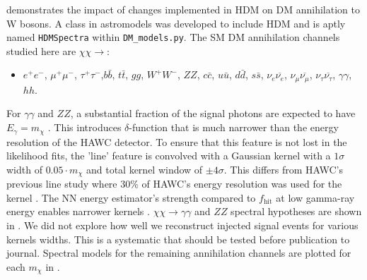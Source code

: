  demonstrates the impact of changes implemented in HDM on DM
annihilation to W bosons.
A class in astromodels was developed to include HDM and is aptly named \texttt{HDMSpectra} within \texttt{DM\_models.py}.
The SM DM annihilation channels studied here are $\chi\chi \rightarrow$:
\begin{itemize}
    \item[] $e^+e^-$, $\mu^+\mu^-$, $\tau^+\tau^-$,$b\bar{b}$, $t\bar{t}$, $gg$, $W^+W^-$, $ZZ$, $c\bar{c}$, $u\bar{u}$, $d\bar{d}$, $s\bar{s}$, $\nu_e \overline{\nu_e}$, $\nu_\mu \overline{\nu_\mu}$, $\nu_\tau \overline{\nu_\tau}$, $\gamma\gamma$, $hh$.
\end{itemize}
For $\gamma\gamma$ and $ZZ$, a substantial fraction of the signal photons are expected to have $E_\gamma = m_\chi$ \cite{HDMSpectra}.
This introduces $\delta$-function that is much narrower than the energy resolution of the HAWC detector.
To ensure that this feature is not lost in the likelihood fits, the 'line' feature is convolved with a Gaussian kernel with a $1\sigma$ width of $0.05 \cdot m_\chi$ and total kernel window of $\pm4\sigma$.
This differs from HAWC's previous line study where 30\% of HAWC's energy resolution was used for the kernel \cite{HAWC_dm_gammalines}.
The NN energy estimator's strength compared to $f_\mathrm{hit}$ at low gamma-ray energy enables narrower kernels \cite{HDMSpectra}.
$\chi\chi \rightarrow \gamma\gamma$ and $ZZ$ spectral hypotheses are shown in .
We did not explore how well we reconstruct injected signal events for various kernels widths.
This is a systematic that should be tested before publication to journal.
Spectral models for the remaining annihilation channels are plotted for each $m_\chi$ in .

